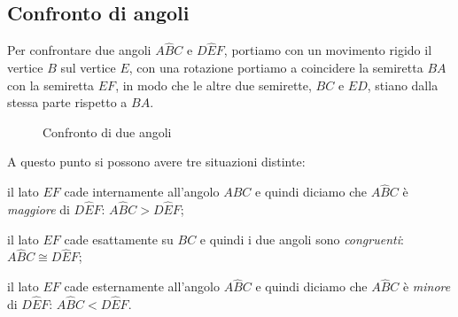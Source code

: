 \subsection{Confronto di angoli}

Per confrontare due angoli $A\widehat{B}C$ e $D\widehat{E}F$, 
portiamo con un movimento rigido il vertice $B$ sul vertice $E$, con 
una rotazione portiamo a coincidere la semiretta $BA$ con la 
semiretta $EF$, in modo che le altre due semirette, $BC$ e $ED$, 
stiano dalla stessa parte rispetto a $BA$.


\begin{inaccessibleblock}
 \begin{figure}[htb]
\centering
\caption{Confronto di due angoli}
\end{figure}
\end{inaccessibleblock}

A questo punto si possono avere tre situazioni distinte:
\begin{itemize*}
\item il lato $EF$ cade internamente all'angolo $A\widehat{B}C$ e 
quindi diciamo che $A\widehat{B}C$ è \emph{maggiore} di 
$D\widehat{E}F$: $A\widehat{B}C>D\widehat{E}F$;
\item il lato $EF$ cade esattamente su $BC$ e quindi i due angoli 
sono \emph{congruenti}: $A\widehat{B}C\cong D\widehat{E}F$;
\item il lato $EF$ cade esternamente all'angolo $A\widehat{B}C$ e 
quindi diciamo che $A\widehat{B}C$ è \emph{minore} di 
$D\widehat{E}F$: $A\widehat{B}C<D\widehat{E}F$.
\end{itemize*}

\begin{comment}
Puoi usare le seguenti righe per come schema da riempire ogni volta che vuoi 
descrivere una procedura
Le copi dove vuoi realizzare una procedura, aggiungi gli \item necessari, e ci 
copi dentro i pezzi di testo che hai già scritto.

\begin{procedura}
 :
\begin{enumerate} [nosep]
\item 

\item 

\item 

\end{enumerate}
\end{procedura}

\end{comment}

